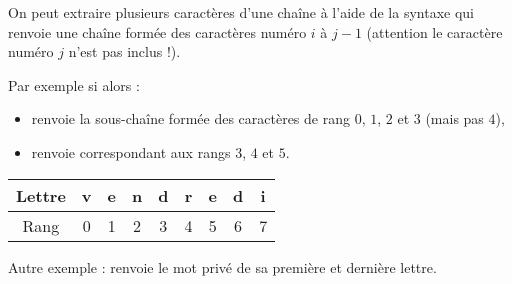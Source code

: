 \documentclass[11pt,class=report,crop=false]{standalone}
\begin{document}

\begin{cours}
\sauteligne

On peut extraire plusieurs caractères d'une chaîne à l'aide de la syntaxe  qui renvoie une chaîne formée des caractères numéro $i$ à $j-1$ (attention le caractère numéro $j$ n'est pas inclus !).

Par exemple si  alors :
\begin{itemize}
  \item {} renvoie la sous-chaîne  formée des caractères de rang $0$, $1$, $2$ et $3$ (mais pas $4$),
  \item {} renvoie  correspondant aux rangs $3$, $4$ et $5$.
\end{itemize}  

\begin{center}
\begin{tabular}{|c||c|c|c|c|c|c|c|c|}
\hline
Lettre & v & e & n & d & r & e & d & i \\ \hline
Rang   & 0 & 1 & 2 & 3 & 4 & 5 & 6 & 7\\ \hline
\end{tabular}
\end{center}
 
Autre exemple :  renvoie le mot privé de sa première et dernière lettre.
\end{cours}


\end{document}
